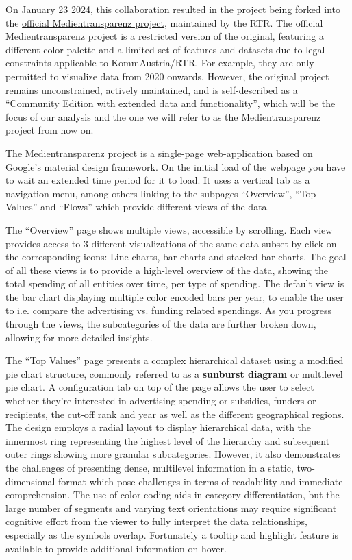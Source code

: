\documentclass{vgtc}
\begin{document}
On January 23 2024, this collaboration resulted in the project being forked into the \href{https://visualisierung.medientransparenz.rtr.at/home}{official Medientransparenz project}, maintained by the RTR. The official Medientransparenz project is a restricted version of the original, featuring a different color palette and a limited set of features and datasets due to legal constraints applicable to KommAustria/RTR. For example, they are only permitted to visualize data from 2020 onwards. However, the original project remains unconstrained, actively maintained, and is self-described as a ``Community Edition with extended data and functionality'', which will be the focus of our analysis and the one we will refer to as the Medientransparenz project from now on.

The Medientransparenz project is a single-page web-application based on Google's material design framework. On the initial load of the webpage you have to wait an extended time period for it to load. It uses a vertical tab as a navigation menu, among others linking to the subpages ``Overview'', ``Top Values'' and ``Flows'' which provide different views of the data.

The ``Overview'' page shows multiple views, accessible by scrolling. Each view provides access to 3 different visualizations of the same data subset by click on the corresponding icons: Line charts, bar charts and stacked bar charts. The goal of all these views is to provide a high-level overview of the data, showing the total spending of all entities over time, per type of spending. The default view is the bar chart displaying multiple color encoded bars per year, to enable the user to i.e. compare the advertising vs. funding related spendings. As you progress through the views, the subcategories of the data are further broken down, allowing for more detailed insights. 

The ``Top Values'' page presents a complex hierarchical dataset using a modified pie chart structure, commonly referred to as a \textbf{sunburst diagram} or multilevel pie chart. A configuration tab on top of the page allows the user to select whether they're interested in advertising spending or subsidies, funders or recipients, the cut-off rank and year as well as the different geographical regions.
The design employs a radial layout to display hierarchical data, with the innermost ring representing the highest level of the hierarchy and subsequent outer rings showing more granular subcategories. However, it also demonstrates the challenges of presenting dense, multilevel information in a static, two-dimensional format which pose challenges in terms of readability and immediate comprehension. The use of color coding aids in category differentiation, but the large number of segments and varying text orientations may require significant cognitive effort from the viewer to fully interpret the data relationships, especially as the symbols overlap. Fortunately a tooltip and highlight feature is available to provide additional information on hover.
\end{document}
